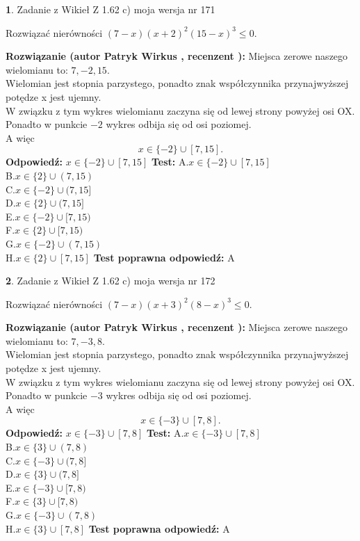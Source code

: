 \documentclass[12pt, a4paper]{article}
\theoremstyle{definition} %
\newtheorem{zad}{}
\newcommand{\zadStart}[1]{\begin{zad}#1\newline}
\newcommand{\zadStop}{\end{zad}}
\newcommand{\rozwStart}[2]{\noindent \textbf{Rozwiązanie (autor #1 , recenzent #2): }\newline}
\newcommand{\rozwStop}{\newline}
\newcommand{\odpStart}{\noindent \textbf{Odpowiedź:}\newline}
\newcommand{\odpStop}{\newline}
\newcommand{\testStart}{\noindent \textbf{Test:}\newline}
\newcommand{\testStop}{\newline}
\newcommand{\kluczStart}{\noindent \textbf{Test poprawna odpowiedź:}\newline}
\newcommand{\kluczStop}{\newline}
\begin{document}
\zadStart{Zadanie z Wikieł Z 1.62 c) moja wersja nr 171}

Rozwiązać nierówności $(7-x)(x+2)^{2}(15-x)^{3}\le0$.
\zadStop
\rozwStart{Patryk Wirkus}{}
Miejsca zerowe naszego wielomianu to: $7, -2, 15$.\\
Wielomian jest stopnia parzystego, ponadto znak współczynnika przy\linebreak najwyższej potędze x jest ujemny.\\ W związku z tym wykres wielomianu zaczyna się od lewej strony powyżej osi OX.\\
Ponadto w punkcie $-2$ wykres odbija się od osi poziomej.\\
A więc $$x \in \{-2\} \cup [7,15].$$
\rozwStop
\odpStart
$x \in \{-2\} \cup [7,15]$
\odpStop
\testStart
A.$x \in \{-2\} \cup [7,15]$\\
B.$x \in \{2\} \cup (7,15)$\\
C.$x \in \{-2\} \cup (7,15]$\\
D.$x \in \{2\} \cup (7,15]$\\
E.$x \in \{-2\} \cup [7,15)$\\
F.$x \in \{2\} \cup [7,15)$\\
G.$x \in \{-2\} \cup (7,15)$\\
H.$x \in \{2\} \cup [7,15]$
\testStop
\kluczStart
A
\kluczStop



\zadStart{Zadanie z Wikieł Z 1.62 c) moja wersja nr 172}

Rozwiązać nierówności $(7-x)(x+3)^{2}(8-x)^{3}\le0$.
\zadStop
\rozwStart{Patryk Wirkus}{}
Miejsca zerowe naszego wielomianu to: $7, -3, 8$.\\
Wielomian jest stopnia parzystego, ponadto znak współczynnika przy\linebreak najwyższej potędze x jest ujemny.\\ W związku z tym wykres wielomianu zaczyna się od lewej strony powyżej osi OX.\\
Ponadto w punkcie $-3$ wykres odbija się od osi poziomej.\\
A więc $$x \in \{-3\} \cup [7,8].$$
\rozwStop
\odpStart
$x \in \{-3\} \cup [7,8]$
\odpStop
\testStart
A.$x \in \{-3\} \cup [7,8]$\\
B.$x \in \{3\} \cup (7,8)$\\
C.$x \in \{-3\} \cup (7,8]$\\
D.$x \in \{3\} \cup (7,8]$\\
E.$x \in \{-3\} \cup [7,8)$\\
F.$x \in \{3\} \cup [7,8)$\\
G.$x \in \{-3\} \cup (7,8)$\\
H.$x \in \{3\} \cup [7,8]$
\testStop
\kluczStart
A
\kluczStop
\end{document}
